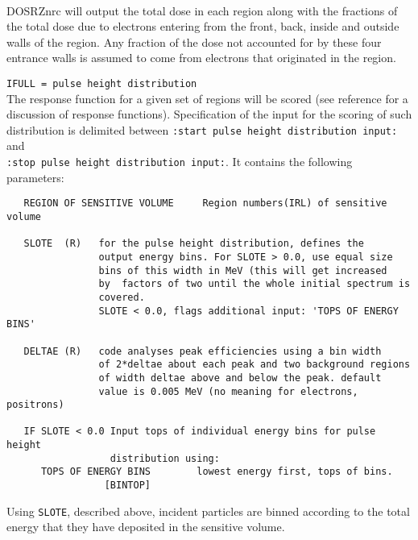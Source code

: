 \documentclass[12pt,twoside]{article}  %
\begin{document}
\\     DOSRZnrc will output the total dose
in each region along with the fractions of the total dose due to
electrons entering from the front, back, inside and outside
walls of the region.  Any fraction of the dose not accounted for
by these four
entrance walls is assumed to come from electrons that originated in the
region.

\noindent \verb+IFULL = pulse height distribution+\\
The response function for a given set of regions will be scored (see
reference\cite{Ro82} for a discussion of response functions).
Specification of the input for the scoring of such distribution
is delimited between \verb+:start pulse height distribution input:+ and\\
\verb+:stop pulse height distribution input:+.
It contains the following parameters:
\begin{verbatim}
   REGION OF SENSITIVE VOLUME     Region numbers(IRL) of sensitive volume

   SLOTE  (R)   for the pulse height distribution, defines the
                output energy bins. For SLOTE > 0.0, use equal size
                bins of this width in MeV (this will get increased
                by  factors of two until the whole initial spectrum is
                covered.
                SLOTE < 0.0, flags additional input: 'TOPS OF ENERGY BINS'

   DELTAE (R)   code analyses peak efficiencies using a bin width
                of 2*deltae about each peak and two background regions
                of width deltae above and below the peak. default
                value is 0.005 MeV (no meaning for electrons, positrons)

   IF SLOTE < 0.0 Input tops of individual energy bins for pulse height
                  distribution using:
      TOPS OF ENERGY BINS        lowest energy first, tops of bins.
                 [BINTOP]

\end{verbatim}
Using {\tt SLOTE}, described above, incident particles are binned according to
the total
energy that they have deposited in the sensitive volume.
\end{document}
